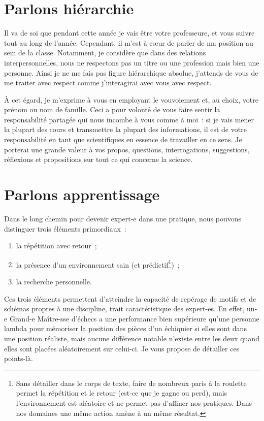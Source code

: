 \documentclass[a4paper, 12pt, final, garamond]{book}
\begin{document}
\section{Parlons hiérarchie}

Il va de soi que pendant cette année je vais être votre professeure, et vous
suivre tout au long de l'année. Cependant, il m'est à cœur de parler de ma
position au sein de la classe. Notamment, je considère que dans des relations
interpersonnelles, nous ne respectons pas un titre ou une profession mais bien
une personne. Ainsi je ne me fais pas figure hiérarchique absolue, j'attends de
vous de me traiter avec respect comme j'interagirai avec vous avec respect.

À cet égard, je m'exprime à vous en employant le vouvoiement et, au choix, votre
prénom ou nom de famille. Ceci a pour volonté de vous faire sentir la
responsabilité partagée qui nous incombe à vous comme à moi~: si je vais mener
la plupart des cours et transmettre la plupart des informations, il est de votre
responsabilité en tant que scientifiques en essence de travailler en ce sens. Je
porterai une grande valeur à vos propos, questions, interrogations, suggestions,
réflexions et propositions sur tout ce qui concerne la science.

\section{Parlons apprentissage}

Dans le long chemin pour devenir expert-e dans une pratique, nous pouvons
distinguer trois éléments primordiaux~:
\begin{enumerate}
    \item la répétition avec retour~;
    \item la présence d'un environnement sain (et prédictif\footnote{Sans
            détailler dans le corps de texte, faire de nombreux paris à la
            roulette permet la répétition et le retour (est-ce que je gagne ou
            perd), mais l'environnement est aléatoire et ne permet pas d'affiner
            nos pratiques. Dans nos domaines une même action amène à un même
        résultat.})~;
    \item la recherche personnelle.
\end{enumerate}

Ces trois éléments permettent d'atteindre la capacité de repérage de motifs et
de schémas propres à une discipline, trait caractéristique des expert-es. En
effet, un-e Grand-e Maître-sse d'échecs a une performance bien supérieure qu'une
personne lambda pour mémoriser la position des pièces d'un échiquier si elles
sont dans une position réaliste, mais aucune différence notable n'existe entre
les deux quand elles sont placées aléatoirement sur celui-ci. Je vous propose de
détailler ces points-là.
\end{document}
